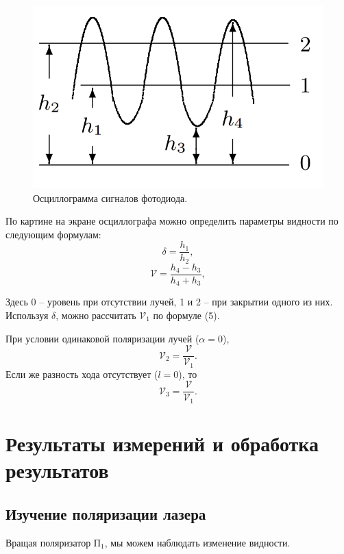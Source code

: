 \documentclass[12pt, a4paper]{article}
\newcommand{\V}{\mathcal{V}}
\begin{document}
\begin{figure}
    \begin{center}
        \vspace{-30pt}
        \includegraphics[width = 0.85\linewidth]{pics/osc.png}
    \end{center}
    \caption{Осциллограмма сигналов фотодиода.}
    \label{fig:osc}
\end{figure}
\vspace{10pt}
По картине на экране осциллографа можно определить параметры видности по следующим формулам:
\begin{equation}
    \delta = \dfrac{h_1}{h_2},
\end{equation}
\begin{equation}
    \V = \dfrac{h_4 - h_3}{h_4 + h_3},
\end{equation}

Здесь 0 -- уровень при отсутствии лучей, 1 и 2 -- при закрытии одного из них.
Используя $\delta$, можно рассчитать $\V_1$ по формуле (5). \vspace{20pt}

При условии одинаковой поляризации лучей ($\alpha = 0$),
\begin{equation}
    \V_2 = \dfrac{\V}{\V_1}.
\end{equation}
Если же разность хода отсутствует ($l = 0$), то
\begin{equation}
    \V_3 = \dfrac{\V}{\V_1}.
\end{equation}

\section{Результаты измерений и обработка результатов}
\subsection{Изучение поляризации лазера}
Вращая поляризатор $\text{П}_1$, мы можем наблюдать изменение видности.
\end{document}
